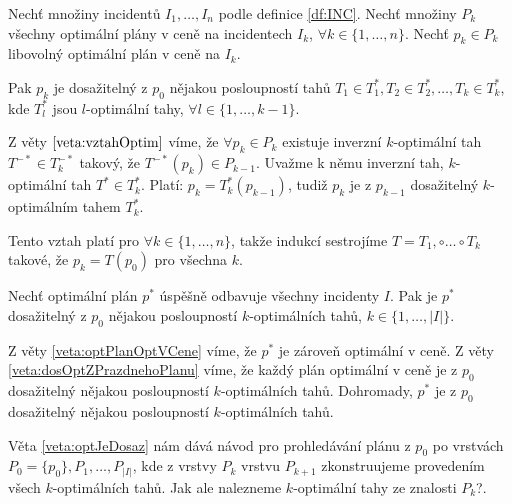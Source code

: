 \begin{veta}\label{veta:dosOptZPrazdnehoPlanu}
  Nechť množiny incidentů $I_1, \dots, I_n$ podle definice \ref{df:INC}.
  Nechť množiny $P_{k}$ všechny optimální plány v ceně na incidentech $I_k$, $\forall k \in \{ 1, \dots, n \}$.
  Nechť $p_k \in P_k$ libovolný optimální plán v ceně na $I_k$.

  Pak $p_k$ je dosažitelný z $p_0$ nějakou posloupností tahů $T_1 \in T^*_1, T_2 \in T^*_2, \dots, T_k \in T^*_k$, kde $T^*_l$ jsou $l$-optimální tahy, $\forall l \in \{ 1, \dots, k-1 \}$.
\end{veta}

\begin{dukaz}
  Z věty $\ref{veta:vztahOptim}$ víme, že $\forall p_k \in P_k$ existuje inverzní $k$-optimální tah $T^{-*} \in T^{-*}_k$ takový, že $T^{-*}(p_k) \in P_{k-1}$.
  Uvažme k němu inverzní tah, $k$-optimální tah $T^* \in T^{*}_k$.
  Platí: $p_k = T^*_k(p_{k-1})$, tudiž $p_{k}$ je z $p_{k-1}$ dosažitelný $k$-optimálním tahem $T^*_k$.

  Tento vztah platí pro $\forall k \in \{ 1, \dots, n \}$, takže indukcí sestrojíme $T = T_1, \circ \dots \circ T_k$ takové, že $p_k = T(p_0)$ pro všechna $k$.
\end{dukaz}

\begin{veta}\label{veta:optJeDosaz}
  Nechť optimální plán $p^*$ úspěšně odbavuje všechny incidenty $I$.
  Pak je $p^*$ dosažitelný z $p_0$ nějakou posloupností $k$-optimálních tahů, $k \in \{ 1, \dots, |I| \}$.
\end{veta}
\begin{dukaz}
  Z věty \ref{veta:optPlanOptVCene} víme, že $p^*$ je zároveň optimální v ceně.
  Z věty \ref{veta:dosOptZPrazdnehoPlanu} víme, že každý plán optimální v ceně je z $p_0$ dosažitelný nějakou posloupností $k$-optimálních tahů.
  Dohromady, $p^*$ je z $p_0$ dosažitelný nějakou posloupností $k$-optimálních tahů.
\end{dukaz}

Věta \ref{veta:optJeDosaz} nám dává návod pro prohledávání plánu z $p_0$ po vrstvách $P_0 = \{ p_0\}, P_1, \dots, P_{|I|}$, 
kde z vrstvy $P_k$ vrstvu $P_{k+1}$ zkonstruujeme provedením všech $k$-optimálních tahů.
Jak ale nalezneme $k$-optimální tahy ze znalosti $P_k$?.

